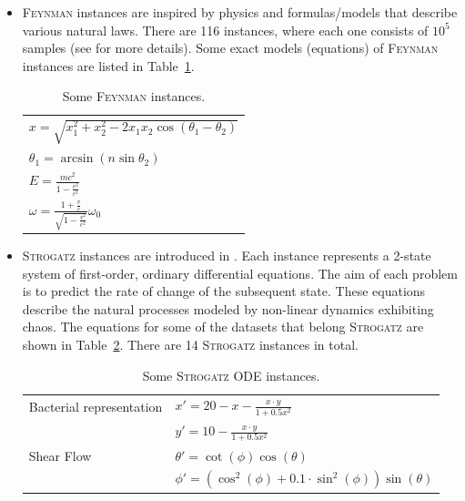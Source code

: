 \documentclass{bmcart}
\begin{document}
\begin{itemize}
	\item \textsc{Feynman} instances are inspired by physics and formulas/models that describe various natural laws.  
	There are 116 instances, where each one consists of $10^5$  samples (see \cite{udrescu2020ai} for more details). Some exact models (equations) of \textsc{Feynman} instances are listed in Table~\ref{tab:Feynamn-Eq}.  
	
	\begin{table}[!ht]
		\caption{Some \textsc{Feynman} instances.}
		\label{tab:Feynamn-Eq}
		\centering
		\begin{tabular}{l}   \hline
			$x = \sqrt{x_1^2 + x_2^2 - 2 x_1 x_2 \cos(\theta_1 - \theta_2)}$ \\
			$ \theta_1 = \arcsin(n \sin \theta_2)$ \\
			$E =  \frac{m c^2 }{1 - \frac{v^2}{c^2}}$ \\
			$\omega = \frac{1 + \frac{v}{c}}{ \sqrt{1 - \frac{v^2}{c^2}}} \omega_0$ \\ \hline
			
		\end{tabular}
	\end{table}
	
	\item \textsc{Strogatz} instances are introduced in \cite{la2016inference}. 
	Each instance represents a 2-state system of first-order, ordinary differential equations. 
	The aim of each problem is to predict the rate of change of the subsequent state. These equations describe the natural processes modeled by non-linear dynamics exhibiting chaos.  The equations for some of the datasets that belong \textsc{Strogatz} are shown in Table~\ref{table:strogatz-ODEs}. There are 14 \textsc{Strogatz} instances in total. 
	
	
	\begin{table}
		\caption{Some \textsc{Strogatz} ODE instances.}
		\label{table:strogatz-ODEs}
		\centering
		\begin{tabular}{ll} \\ \hline
			Bacterial representation &   $x' = 20 - x - \frac{x \cdot y}{1 + 0.5 x^2 }$ \\ 
			&   $y' = 10 - \frac{x \cdot y}{1 + 0.5 x^2  }$ \\ \hline
			Shear Flow               &  $\theta' = \cot(\phi)\cos(\theta)$ \\
			&  $ \phi'  = ( \cos^2(\phi) + 0.1 \cdot \sin^2 (\phi)) \sin(\theta) $ \\ \hline
		\end{tabular}
	\end{table}
	
\end{itemize}
\end{document}
